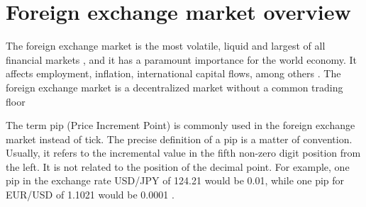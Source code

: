 \section{Foreign exchange market overview}\label{sec:forex_overview}

The foreign exchange market is the most volatile, liquid and largest of all
financial markets
\cite{forex_liquidity,info_forex,forex_market_micro,intraday_forex}, and it has
a paramount importance for the world economy. It affects employment, inflation,
international capital flows, among others \cite{forex_structure}. The foreign
exchange market is a decentralized market without a common trading floor
\cite{info_forex,forex_market_micro,forex_structure,teach_spread}

The term pip (Price Increment Point) is commonly used in the foreign exchange
market instead of tick. The precise definition of a pip is a matter of
convention. Usually, it refers to the incremental value in the fifth non-zero
digit position from the left. It is not related to the position of the decimal
point. For example, one pip in the exchange rate USD/JPY of 124.21 would be
0.01, while one pip for EUR/USD of 1.1021 would be 0.0001
\cite{forex_market_micro,forex_structure,order_flow_forex,micro_eff}.